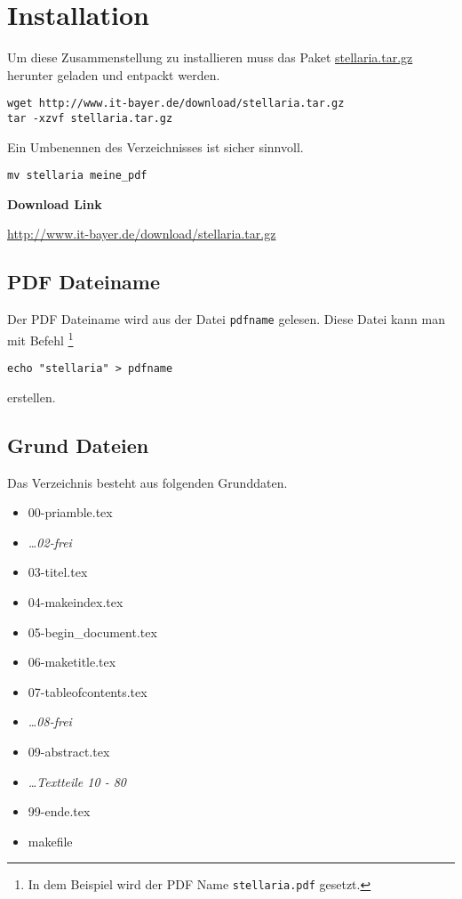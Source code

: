 \section{Installation}
\label{sec:installation}

Um diese Zusammenstellung zu installieren muss das Paket
\href{http://www.it-bayer.de/download/stellaria.tar.gz}{stellaria.tar.gz} 
herunter geladen und entpackt werden.

\begin{verbatim}
wget http://www.it-bayer.de/download/stellaria.tar.gz
tar -xzvf stellaria.tar.gz
\end{verbatim}

Ein Umbenennen des Verzeichnisses ist sicher sinnvoll.

\begin{verbatim}
mv stellaria meine_pdf
\end{verbatim}

\textbf{Download Link} 

\url{http://www.it-bayer.de/download/stellaria.tar.gz}

\subsection{PDF Dateiname}
\label{ssec:pdf_dateiname}

Der PDF Dateiname wird aus der Datei \verb!pdfname!
gelesen. Diese Datei kann man mit Befehl%
\footnote{%
In dem Beispiel wird der PDF Name \texttt{stellaria.pdf} gesetzt.
}

\begin{verbatim}
echo "stellaria" > pdfname
\end{verbatim}

erstellen.






\subsection{Grund Dateien}
\label{ssec:grund-dateien}

\todo

Das Verzeichnis besteht aus folgenden Grunddaten.

\begin{itemize}
	\item 00-priamble.tex
	\item \emph{\dots 02-frei}
	\item 03-titel.tex
	\item 04-makeindex.tex
	\item 05-begin\_document.tex
	\item 06-maketitle.tex
	\item 07-tableofcontents.tex
	\item \emph{\dots 08-frei}
	\item 09-abstract.tex
	\item \emph{\dots Textteile 10 - 80}
	\item 99-ende.tex
	\item makefile
\end{itemize}





